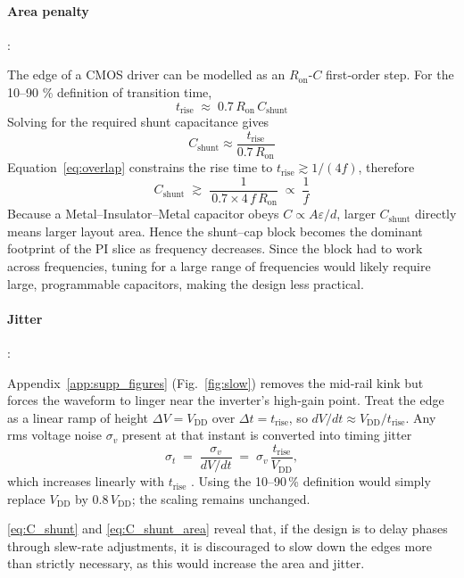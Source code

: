 \paragraph{Area penalty}:

The edge of a CMOS driver can be modelled as an \(R_{\text{on}}\)-\(C\) first‑order step.  
For the 10--90 \% definition of transition time,
\[
  t_{\text{rise}}\;\approx\;0.7\,R_{\text{on}}\,C_{\text{shunt}}
\]
Solving for the required shunt capacitance gives  
\[
  C_{\text{shunt}} \approx \frac{t_{\text{rise}}}{0.7\,R_{\text{on}}}
  \label{eq:C_shunt_area}
\]
Equation~\eqref{eq:overlap} constrains the rise time to
\(t_{\text{rise}}\gtrsim 1/(4f)\), therefore  
\[
  C_{\text{shunt}}
  \;\gtrsim\; 
  \frac{1}{\,0.7 \times 4\,f\,R_{\text{on}}}
  \;\propto\;\frac{1}{f}
  \label{eq:C_shunt}
\]
Because a Metal–Insulator–Metal capacitor obeys \(C\propto A\varepsilon/d\),
larger \(C_{\text{shunt}}\) directly means larger layout area.  
Hence the shunt–cap block becomes the dominant footprint of the PI slice as frequency decreases. 
Since the block had to work across frequencies, tuning for a large range of frequencies would likely require large, programmable capacitors, making the design less practical.

\paragraph{Jitter}:

Appendix~\ref{app:supp_figures} (Fig.~\ref{fig:slow}) removes the mid‑rail kink but forces the waveform to
linger near the inverter’s high‑gain point.  Treat the edge as a linear ramp
of height \(\Delta V = V_{\text{DD}}\) over
\(\Delta t = t_{\text{rise}}\), so
\(dV/dt \approx V_{\text{DD}}/t_{\text{rise}}\).
Any rms voltage noise \(\sigma_v\) present at that instant is converted into
timing jitter
\[
  \sigma_t
  \;=\;
  \frac{\sigma_v}{dV/dt}
  \;=\;
  \sigma_v \,\frac{t_{\text{rise}}}{V_{\text{DD}}},
\]
which increases linearly with \(t_{\text{rise}}\)
\cite{TektronixJitterPrimer2012}.  Using the 10--90\,\% definition would simply
replace \(V_{\text{DD}}\) by \(0.8\,V_{\text{DD}}\); the scaling remains
unchanged.

\ref{eq:C_shunt} and \ref{eq:C_shunt_area} reveal that, if the design is to delay phases through slew-rate adjustments, it is discouraged to slow down the edges more than strictly necessary, as this would increase the area and jitter.

